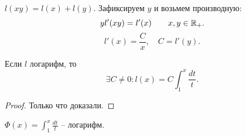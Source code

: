 \documentclass[12pt]{report}
\begin{document}
\begin{thm}$ $

    $ l(xy) = l(x) + l(y)$.
    Зафиксируем $ y$ и возьмем производную:
\[
    y l'(xy) = l'(x) \qquad x, y \in  \mathbb{R}_{+}
.\] 
\[
    l'(x) = \frac{C}{x}, \quad C = l'(y)
.\] 
\end{thm}
\begin{thm}
    Если $ l$ логарифм, то \[
	\exists  C \ne 0 : l(x) = C \int_1 ^{x} \frac{dt}{t}
    .\] 
\end{thm}
\begin{proof}
    Только что доказали.
\end{proof}
\begin{thm}
    $ \Phi(x) = \int_1^{x} \frac{dt}{t}$ -- логарифм.
\end{thm}
\end{document}
